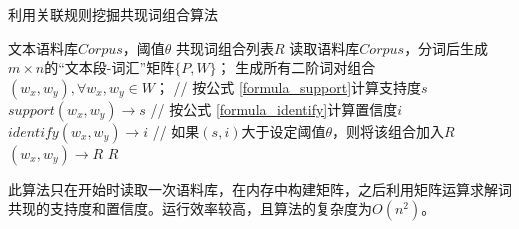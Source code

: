 \begin{algorithm}[htb]
\caption{利用关联规则挖掘共现词组合算法}
\label{alg:co_word}
\begin{algorithmic}[1]
\REQUIRE 文本语料库$Corpus$，阈值$\theta$
\ENSURE 共现词组合列表$R$
\STATE 读取语料库$Corpus$，分词后生成$m \times n$的“文本段-词汇”矩阵$\{ P, W\}$；
\STATE 生成所有二阶词对组合$(w_x, w_y), \forall w_x, w_y \in W$；
    \STATE // 按公式 \ref{formula_support}计算支持度$s$
    \STATE $support(w_x, w_y) \to s$
    \STATE // 按公式 \ref{formula_identify}计算置信度$i$ 
    \STATE $identify(w_x, w_y) \to i$     
    \STATE // 如果$(s,i)$大于设定阈值$\theta$，则将该组合加入$R$
        \STATE $(w_x, w_y) \to R$
    \ENDIF
\ENDFOR
\RETURN $R$
\end{algorithmic}
\end{algorithm}

此算法只在开始时读取一次语料库，在内存中构建矩阵，之后利用矩阵运算求解词共现的支持度和置信度。运行效率较高，且算法的复杂度为$O(n^2)$。

